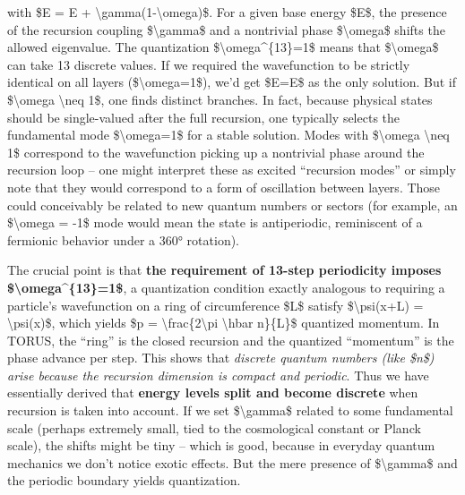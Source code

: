 \documentclass[
]{article}
\begin{document}
with \$E\textquotesingle{} = E +
\textbackslash gamma(1-\textbackslash omega)\$\hspace{0pt}. For a given
base energy \$E\$, the presence of the recursion coupling
\$\textbackslash gamma\$ and a nontrivial phase \$\textbackslash omega\$
shifts the allowed eigenvalue. The quantization
\$\textbackslash omega\^{}\{13\}=1\$ means that \$\textbackslash omega\$
can take 13 discrete values. If we required the wavefunction to be
strictly identical on all layers (\$\textbackslash omega=1\$), we'd get
\$E\textquotesingle=E\$ as the only solution. But if
\$\textbackslash omega \textbackslash neq 1\$, one finds distinct
branches. In fact, because physical states should be single-valued after
the full recursion, one typically selects the fundamental mode
\$\textbackslash omega=1\$ for a stable solution\hspace{0pt}. Modes with
\$\textbackslash omega \textbackslash neq 1\$ correspond to the
wavefunction picking up a nontrivial phase around the recursion loop --
one might interpret these as excited ``recursion modes'' or simply note
that they would correspond to a form of oscillation between
layers\hspace{0pt}. Those could conceivably be related to new quantum
numbers or sectors (for example, an \$\textbackslash omega = -1\$ mode
would mean the state is antiperiodic, reminiscent of a fermionic
behavior under a 360° rotation).

The crucial point is that \textbf{the requirement of 13-step periodicity
imposes \$\textbackslash omega\^{}\{13\}=1\$}, a quantization condition
exactly analogous to requiring a particle's wavefunction on a ring of
circumference \$L\$ satisfy \$\textbackslash psi(x+L) =
\textbackslash psi(x)\$, which yields \$p =
\textbackslash frac\{2\textbackslash pi \textbackslash hbar n\}\{L\}\$
quantized momentum\hspace{0pt}. In TORUS, the ``ring'' is the closed
recursion and the quantized ``momentum'' is the phase advance per step.
This shows that \emph{discrete quantum numbers (like \$n\$) arise
because the recursion dimension is compact and periodic}. Thus we have
essentially derived that \textbf{energy levels split and become
discrete} when recursion is taken into account\hspace{0pt}. If we set
\$\textbackslash gamma\$ related to some fundamental scale (perhaps
extremely small, tied to the cosmological constant or Planck scale), the
shifts might be tiny -- which is good, because in everyday quantum
mechanics we don't notice exotic effects. But the mere presence of
\$\textbackslash gamma\$ and the periodic boundary yields quantization.
\end{document}
